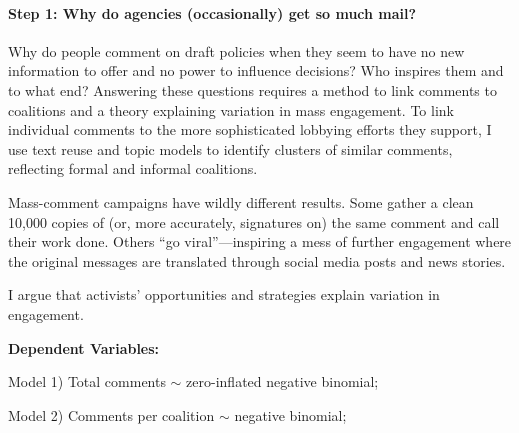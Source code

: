 \paragraph{Step 1: Why do agencies (occasionally) get so much mail?} 



Why do people comment on draft policies when they seem to have no new information to offer and no power to influence decisions? Who inspires them and to what end? 
Answering these questions requires a method to link comments to coalitions and a theory explaining variation in mass engagement.  
To link individual comments to the more sophisticated lobbying efforts they support, I use text reuse and topic models to identify clusters of similar comments, reflecting formal and informal coalitions.

Mass-comment campaigns have wildly different results. Some gather a clean 10,000 copies of (or, more accurately, signatures on) the same comment and call their work done. Others ``go viral''---inspiring a mess of further engagement where the original messages are translated through social media posts and news stories.

I argue that activists' opportunities and strategies explain variation in engagement. %


\textbf{Dependent Variables:} 

Model 1) Total comments $\sim$ zero-inflated negative binomial; 

Model 2) Comments per coalition $\sim$ negative binomial; 

